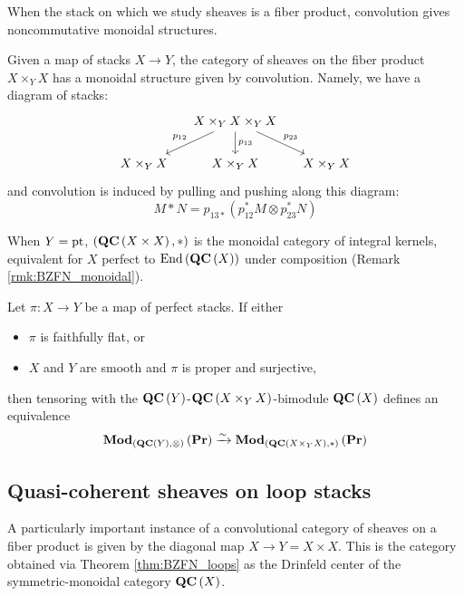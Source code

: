 When the stack on which we study sheaves is a fiber product, convolution gives
noncommutative monoidal structures.

Given a map of stacks $X\to Y$, the category of sheaves on the fiber product $X\times_Y X$
has a monoidal structure given by convolution.
Namely, we have a diagram of stacks:
\begin{equation*}
\begin{tikzcd}[column sep=small]
 & X\times_Y X\times_Y X
   \arrow[dl, "p_{12}"']
   \arrow[d, "p_{13}"]
   \arrow[dr, "p_{23}"] & \\
 X\times_Y X & X\times_Y X & X\times_Y X
\end{tikzcd}
\end{equation*}
and convolution
is induced by pulling and pushing along this diagram:
\begin{equation*}
M* N = p_{13*}\left(p_{12}^*M\otimes p_{23}^*N\right)
\end{equation*}

\begin{exm}
When $Y = \text{pt}$, $\left(\mathbf{QC}\left(X\times X\right),*\right)$ is the monoidal category of integral
kernels, equivalent for $X$ perfect to $\operatorname{End}\left(\mathbf{QC}\left(X\right)\right)$ under composition
(Remark \ref{rmk:BZFN_monoidal}).
\end{exm}

\begin{theorem}
Let $\pi \colon X \to Y$ be a map of perfect stacks.
If either
\begin{itemize}
\item $\pi$ is faithfully flat, or
\item $X$ and $Y$ are smooth and $\pi$ is proper and surjective,
\end{itemize}
then tensoring with
the $\mathbf{QC}\left(Y\right)$-$\mathbf{QC}\left(X\times_Y X\right)$-bimodule $\mathbf{QC}\left(X\right)$ defines
an equivalence
\begin{equation*}
\mathbf{Mod}_{\left(\mathbf{QC}\left(Y\right) , \otimes\right)}\left(\mathbf{Pr}\right) \xrightarrow{\sim}
\mathbf{Mod}_{\left(\mathbf{QC}\left(X\times_Y X\right) , *\right)}\left(\mathbf{Pr}\right)
\end{equation*}
\label{thm:BZFN_app}
\end{theorem}

\subsection{Quasi-coherent sheaves on loop stacks}

A particularly important instance of a convolutional category of sheaves on a fiber
product is given by the diagonal map $X \to Y = X\times X$.
This is the category obtained via Theorem \ref{thm:BZFN_loops} as the Drinfeld center of
the symmetric-monoidal category $\mathbf{QC}\left(X\right)$.

